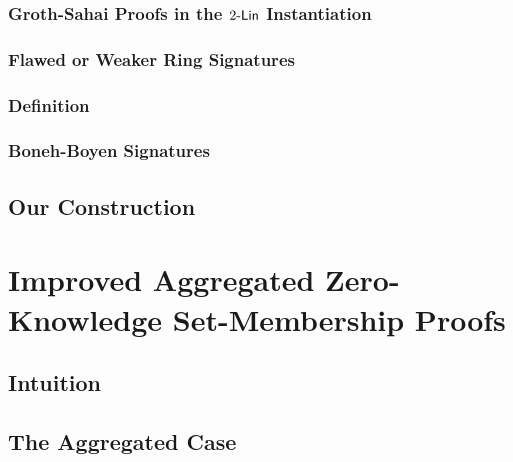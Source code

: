         \subsection{Groth-Sahai Proofs in the $2\mbox{-}\mathsf{Lin}$ Instantiation}
        
            

        \subsection{Flawed or Weaker Ring Signatures}\label{sec:rs-flawed}
    
            

        \subsection{Definition}
    
            

        \subsection{Boneh-Boyen Signatures} \label{sec:bbs}
    
            

    \section{Our Construction}
    
        


\chapter{Improved Aggregated Zero-Knowledge Set-Membership Proofs} \label{improved-aZKSMP} \label{sec:improved-aZKSMP}

    
        
\section{Intuition} \label{sec:improved-aZKSMP-intuition}
    
    

    \section{The Aggregated Case} \label{sec:log-set-memb-Z}
        
